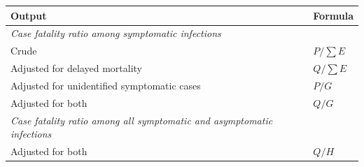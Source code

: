 \documentclass{article}
\begin{document}
	\begin{table}[h]
		\centering
		
		\begin{tabular}{ll}
			
			\hline
			Output & Formula \\
			\hline
			\textit{Case fatality ratio among symptomatic infections} &  \\
			Crude & $P/\sum E$  \\
			
			Adjusted for delayed mortality  &  $Q/\sum E$ \\
			
			Adjusted for unidentified symptomatic cases  &  $P/G$\\
			
			Adjusted for both &  $Q/G$\\
			
			\textit{Case fatality ratio among all symptomatic and asymptomatic infections} & \\
			Adjusted for both  &  $Q/H$ \\
			\hline
		\end{tabular}
	\end{table}
	
	
	
\end{document}

